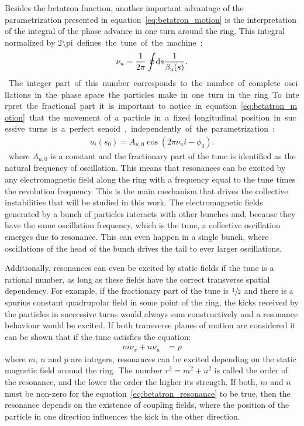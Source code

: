 	Besides the betatron function, another important advantage of the parametrization presented in equation~\eqref{eq:betatron_motion} is the interpretation of the integral of the phase advance in one turn around the ring. This integral normalized by \SI{2\pi} defines the tune of the machine:
	\begin{align}
		\nu_u = \frac{1}{2\pi}\oint\!\text{d}s \frac{1}{\beta_u(s)}.
	\end{align}
	The integer part of this number corresponds to the number of complete oscillations in the phase space the particles make in one turn in the ring. To interpret the fractional part it is important to notice in equation~\eqref{eq:betatron_motion} that the movement of a particle in a fixed longitudinal position in sucessive turns is a perfect senoid, independently of the parametrization:
	\begin{align}
		u_i(s_0) = A_{u,0}\cos(2\pi\nu_u i -\phi_0).
	\end{align}
	where $A_{u,0}$ is a constant and the fractionary part of the tune is identified as the natural frequency of oscillation. This means that resonances can be excited by any electromagnetic field along the ring with a frequency equal to the tune times the revolution frequency. This is the main mechanism that drives the collective instabilities that will be studied in this work. The electromagnetic fields generated by a bunch of particles interacts with other bunches and, because they have the same oscillation frequency, which is the tune, a collective oscillation emerges due to resonance. This can even happen in a single bunch, where oscillations of the head of the bunch drives the tail to ever larger oscillations.

	Additionally, resonances can even be excited by static fields if the tune is a rational number, as long as these fields have the correct transverse spatial dependency. For example, if the fractionary part of the tune is $\sfrac12$ and there is a spurius constant quadrupolar field in some point of the ring, the kicks received by the particles in successive turns would always sum constructively and a resonance behaviour would be excited. If both transverse planes of motion are considered it can be shown that if the tune satisfies the equation:
	\begin{align}\label{eq:betatron_resonance}
		m\nu_x + n\nu_u &= p
	\end{align}
	where $m$, $n$ and $p$ are integers, resonances can be excited depending on the static magnetic field around the ring. The number $r^2 = m^2 + n^2$ is called the order of the resonance, and the lower the order the higher its strength. If both, $m$ and $n$ must be non-zero for the equation~\eqref{eq:betatron_resonance} to be true, then the resonance depends on the existence of coupling fields, where the position of the particle in one direction influences the kick in the other direction.

